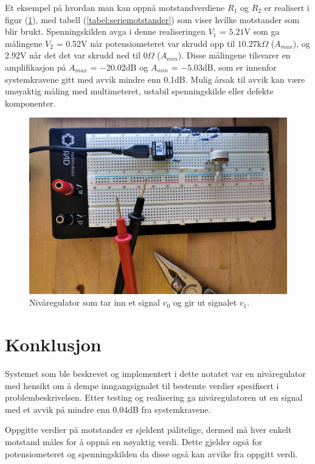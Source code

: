 \documentclass[a4paper,11pt,norsk]{article}
\begin{document}
Et eksempel på hvordan man kan oppnå motstandverdiene $R_1$ og $R_2$ er realisert i figur (\ref{fig:oppkobling.jpg}), med tabell (\ref{tabel:seriemotstander}) som viser hvilke motstander som blir brukt. Spenningskilden avga i denne realiseringen $V_1$ =  $5.21$V som ga målingene $V_2$ = 0.52V når potensiometeret var skrudd opp til $10.27$k$\Omega$ ($A_{max}$), og 2.92V når det det var skrudd ned til 0$\Omega$ ($A_{min}$).
Disse målingene tilsvarer en amplifikasjon på $A_{max}$ =  $-20.02$dB og $A_{min}$ = $-5.03$dB, som er innenfor systemkravene gitt med avvik mindre enn 0.1dB.  
Mulig årsak til avvik kan være unøyaktig måling med multimeteret, ustabil spenningskilde eller defekte komponenter. 

\begin{figure}
  \centering
  \includegraphics[scale=0.1]{D1/Images/oppkobling.jpg}
  \caption{Nivåregulator som tar inn et signal $v_0$ og gir ut signalet $v_1$.}
  \label{fig:oppkobling.jpg}
\end{figure}

\section{Konklusjon}
\label{sec:konklusjon}
Systemet som ble beskrevet og implementert i dette notatet var en nivåregulator med hensikt om å dempe inngangsignalet til bestemte verdier spesifisert i problembeskrivelsen. Etter testing og realisering ga nivåregulatoren ut en signal med et avvik på mindre enn 0.04dB fra systemkravene.

Oppgitte verdier på motstander er sjeldent pålitelige, dermed må hver enkelt motstand måles for å oppnå en nøyaktig verdi. Dette gjelder også for potensiometeret og spenningskilden da disse også kan avvike fra oppgitt verdi.
\end{document}
